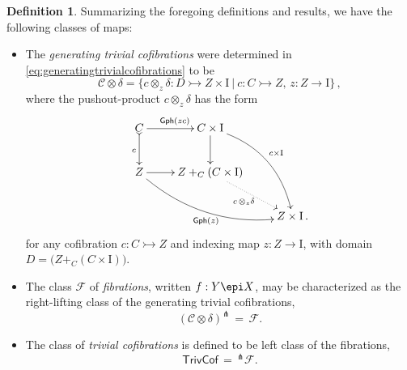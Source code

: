 \documentclass[11pt]{article}
\newcommand{\mono}{\ensuremath{\rightarrowtail}}
\newcommand{\ra}{\ensuremath{\rightarrow}}
\newcommand{\I}{\ensuremath{\mathrm{I}}}
\theoremstyle{remark}
\theoremstyle{definition}
\newtheorem{definition}[theorem]{Definition}
\begin{document}
\begin{definition}\label{def:FibWFSclasses}
Summarizing the foregoing definitions and results, we have the following classes of maps:

%
%

\begin{itemize}
\item  The \emph{generating trivial cofibrations} were determined in \eqref{eq:generatingtrivialcofibrations} to be
\begin{equation}\label{eq:genunbiasedtrivcof}
\mathcal{C}\otimes\delta = \{c \otimes_z \delta : D \mono Z\times\I\ |\  c : C\mono Z,\, z : Z \to \I\}\,,
\end{equation}
where the pushout-product $c\otimes_z \delta$ has the form
\begin{equation}\label{diagram:unbiasedbasicpushoutproduct2}
\xymatrix{
C \ar@{>->}[d]_{c} \ar[r]^{\mathsf{Gph}(zc)} & C\times \I \ar[d] \ar@/^4ex/ [rdd]^{c\times\I}\\
Z \ar@/_4ex/ [rrd]_{\mathsf{Gph}(z)} \ar[r] &  Z +_C (C\times\I) \ar@{.>}[rd]_{c\, \otimes_z \delta} \\
&& Z\times\I\,.
}
\end{equation}
for any cofibration $c : C\mono Z$ and indexing map $z : Z \ra \I$, with domain $D = \big(Z +_C (C\times\I)\big)$.

\item The class $\mathcal{F}$ of \emph{fibrations}, written $f : Y\epi X$, may be characterized as the right-lifting class of the generating trivial cofibrations,
\[
(\mathcal{C}\otimes\delta)^\pitchfork\, =\,\mathcal{F}.
\]

\item The class of \emph{trivial cofibrations} is defined to be left class of the fibrations,
\[
\mathsf{TrivCof}\, =\, ^{\pitchfork}\mathcal{F}.
\]
\end{itemize}
\end{definition}
\end{document}
